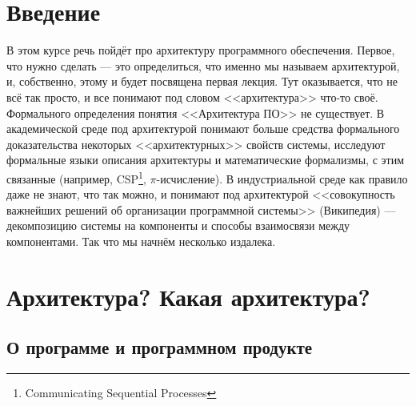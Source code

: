 \documentclass{../../text-style}
\begin{document}
\maketitle
\thispagestyle{empty}

\section{Введение}

В этом курсе речь пойдёт про архитектуру программного обеспечения. Первое, что нужно сделать --- это определиться, что именно мы называем архитектурой, и, собственно, этому и будет посвящена первая лекция. Тут оказывается, что не всё так просто, и все понимают под словом <<архитектура>> что-то своё. Формального определения понятия <<Архитектура ПО>> не существует. В академической среде под архитектурой понимают больше средства формального доказательства некоторых <<архитектурных>> свойств системы, исследуют формальные языки описания архитектуры и математические формализмы, с этим связанные (например, CSP\footnote{Communicating Sequential Processes}, $\pi$-исчисление). В индустриальной среде как правило даже не знают, что так можно, и понимают под архитектурой <<совокупность важнейших решений об организации программной системы>> (\textcopyright Википедия) --- декомпозицию системы на компоненты и способы взаимосвязи между компонентами. Так что мы начнём несколько издалека.

\section{Архитектура? Какая архитектура?}

\subsection{О программе и программном продукте}
\end{document}
